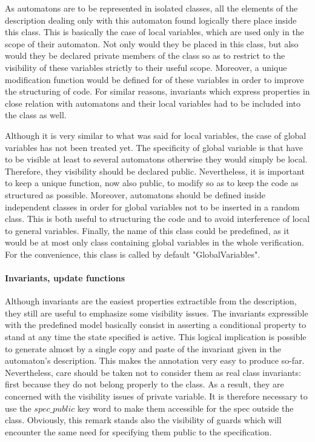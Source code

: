 As automatons are to be represented in isolated classes, all the elements of the description dealing only with this automaton found logically there place inside this class. This is basically the case of local variables, which are used only in the scope of their automaton. Not only would they be placed in this class, but also would they be declared private members of the class so as to restrict to the visibility of these variables strictly to their useful scope. Moreover, a unique modification function would be defined for of these variables in order to improve the structuring of code. For similar reasons, invariants which express properties in close relation with automatons and their local variables had to be included into the class as well. 

Although it is very similar to what was said for local variables, the case of global variables has not been treated yet. The specificity of global variable is that have to be visible at least to several automatons otherwise they would simply be local. Therefore, they visibility should be declared public. Nevertheless, it is important to keep a unique function, now also public, to modify so as to keep the code as structured as possible. Moreover, automatons should be defined inside independent classes in order for global variables not to be inserted in a random class. This is both useful to structuring the code and to avoid interference of local to general variables. Finally, the name of this class could be predefined, as it would be at most only class containing global variables in the whole verification. For the convenience, this class is called by default "GlobalVariables". 

\paragraph{Invariants, update functions}
Although invariants are the easiest properties extractible from the description, they still are useful to emphasize some visibility issues. The invariants expressible with the predefined model basically consist in asserting a conditional property to stand at any time the state specified is active. This logical implication is possible to generate almost by a single copy and paste of the invariant given in the automaton's description. This makes the annotation very easy to produce so-far. Nevertheless, care should be taken not to consider them as real class invariants: first because they do not belong properly to the class. As a result, they are concerned with the visibility issues of private variable. It is therefore necessary to use the $spec\_public$ key word to make them accessible for the spec outside the class. Obviously, this remark stands also the visibility of guards which will encounter the same need for specifying them public to the specification. 

